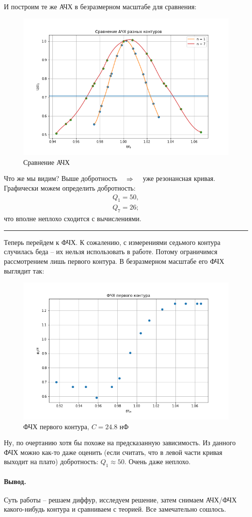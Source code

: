 \documentclass{../lab_class}
\begin{document}
И построим те же АЧХ в безразмерном масштабе для сравнения:

\begin{figure}[H]
	\centering
	\includegraphics[width = 0.82 \textwidth]{freq_response_compar.png}
	\caption{Сравнение АЧХ}
\end{figure}

Что же мы видим? Выше добротность $\quad\Rightarrow\quad$ уже резонансная кривая. Графически можем определить добротность:
\begin{gather*}
	Q_1 = 50, \\
	Q_7 = 26;
\end{gather*}
что вполне неплохо сходится с вычислениями.

\bigskip
\hrule
\bigskip

Теперь перейдем к ФЧХ. К сожалению, с измерениями седьмого контура случилась беда -- их нельзя использовать в работе. Потому ограничимся рассмотрением лишь первого контура. В безразмерном масштабе его ФЧХ выглядит так:

\begin{figure}[H]
	\centering
	\includegraphics[width = 0.82 \textwidth]{phase_response_c1.png}
	\caption{ФЧХ первого контура, $C = 24.8$ нФ}
\end{figure}

Ну, по очертанию хотя бы похоже на предсказанную зависимость. Из данного ФЧХ можно как-то даже оценить (если считать, что в левой части кривая выходит на плато) добротность: $Q_1 \approx 50$. Очень даже неплохо. 

\paragraph{Вывод.}
Суть работы -- решаем диффур, исследуем решение, затем снимаем АЧХ/ФЧХ какого-нибудь контура и сравниваем с теорией. Все замечательно сошлось.
\end{document}
